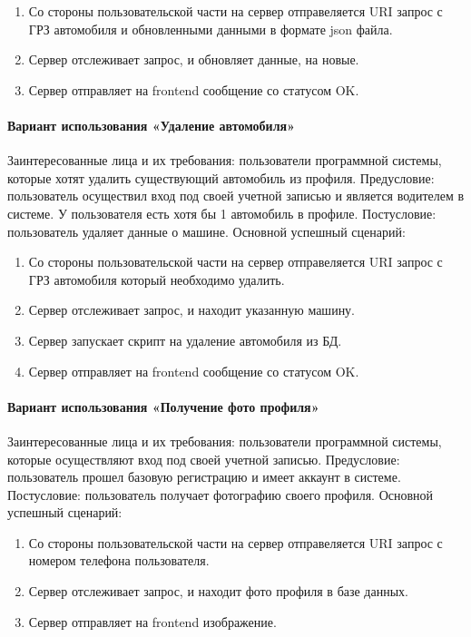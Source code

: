 \begin{enumerate}
	\item Со стороны пользовательской части на сервер отправеляется URI запрос с ГРЗ автомобиля и обновленными данными в формате json файла.
	\item Сервер отслеживает запрос, и обновляет данные, на новые.
	\item Сервер отправляет на frontend сообщение со статусом OK.
\end{enumerate}

\paragraph{Вариант использования «Удаление автомобиля»}
Заинтересованные лица и их требования: пользователи программной системы, которые хотят удалить существующий автомобиль из профиля. Предусловие: пользователь осуществил вход под своей учетной записью и является водителем в системе. У пользователя есть хотя бы 1 автомобиль в профиле. Постусловие: пользователь удаляет данные о машине.
Основной успешный сценарий:

\begin{enumerate}
	\item Со стороны пользовательской части на сервер отправеляется URI запрос с ГРЗ автомобиля который необходимо удалить.
	\item Сервер отслеживает запрос, и находит указанную машину.
	\item Сервер запускает скрипт на удаление автомобиля из БД.
	\item Сервер отправляет на frontend сообщение со статусом OK.
\end{enumerate}

\paragraph{Вариант использования «Получение фото профиля»}
Заинтересованные лица и их требования: пользователи программной системы, которые осуществляют вход под своей учетной записью. Предусловие: пользователь прошел базовую регистрацию и имеет аккаунт в системе. Постусловие: пользователь получает фотографию своего профиля.
Основной успешный сценарий:

\begin{enumerate}
	\item Со стороны пользовательской части на сервер отправеляется URI запрос с номером телефона пользователя.
	\item Сервер отслеживает запрос, и находит фото профиля в базе данных.
	\item Сервер отправляет на frontend изображение.
\end{enumerate}

